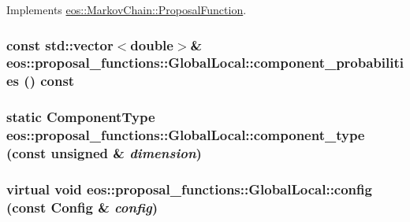 Implements \hyperlink{structeos_1_1MarkovChain_1_1ProposalFunction_a7065079985f8bb44309d7773d85d225b}{eos::MarkovChain::ProposalFunction}.\hypertarget{classeos_1_1proposal__functions_1_1GlobalLocal_aefd282ded908d605356e2c5896db60b7}{
\subsubsection[{component\_\-probabilities}]{\setlength{\rightskip}{0pt plus 5cm}const std::vector$<$double$>$\& eos::proposal\_\-functions::GlobalLocal::component\_\-probabilities () const}}
\label{classeos_1_1proposal__functions_1_1GlobalLocal_aefd282ded908d605356e2c5896db60b7}
\hypertarget{classeos_1_1proposal__functions_1_1GlobalLocal_a26968f54a698fc8726f0a81c84bc6294}{
\subsubsection[{component\_\-type}]{\setlength{\rightskip}{0pt plus 5cm}static {\bf ComponentType} eos::proposal\_\-functions::GlobalLocal::component\_\-type (const unsigned \& {\em dimension})}}
\label{classeos_1_1proposal__functions_1_1GlobalLocal_a26968f54a698fc8726f0a81c84bc6294}
\hypertarget{classeos_1_1proposal__functions_1_1GlobalLocal_a32e17ba3e5210c26c146b97f5ff4fd53}{
\subsubsection[{config}]{\setlength{\rightskip}{0pt plus 5cm}virtual void eos::proposal\_\-functions::GlobalLocal::config (const {\bf Config} \& {\em config})}}
\label{classeos_1_1proposal__functions_1_1GlobalLocal_a32e17ba3e5210c26c146b97f5ff4fd53}


